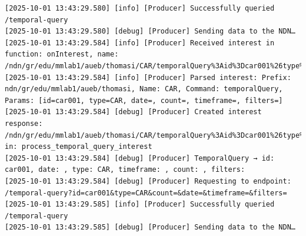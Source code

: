 \documentclass{article}
\begin{document}
\begin{lstlisting}[language=log, caption={Producer logs after receiving a \emph{GET by TYPE} request from \emph{MMLab2}}, label={lst:producer-logs-get-by-type-from-mmlab2}]
[2025-10-01 13:43:29.580] [info] [Producer] Successfully queried /temporal-query
[2025-10-01 13:43:29.580] [debug] [Producer] Sending data to the NDN…
[2025-10-01 13:43:29.584] [info] [Producer] Received interest in function: onInterest, name: /ndn/gr/edu/mmlab1/aueb/thomasi/CAR/temporalQuery%3Aid%3Dcar001%26type%3DCAR%26date%3D%26count%3D%26timeframe%3D%26filters%3D
[2025-10-01 13:43:29.584] [info] [Producer] Parsed interest: Prefix: ndn/gr/edu/mmlab1/aueb/thomasi, Name: CAR, Command: temporalQuery, Params: [id=car001, type=CAR, date=, count=, timeframe=, filters=]
[2025-10-01 13:43:29.584] [debug] [Producer] Created interest response: /ndn/gr/edu/mmlab1/aueb/thomasi/CAR/temporalQuery%3Aid%3Dcar001%26type%3DCAR%26date%3D%26count%3D%26timeframe%3D%26filters%3D in: process_temporal_query_interest
[2025-10-01 13:43:29.584] [debug] [Producer] TemporalQuery → id: car001, date: , type: CAR, timeframe: , count: , filters: 
[2025-10-01 13:43:29.584] [debug] [Producer] Requesting to endpoint: /temporal-query?id=car001&type=CAR&count=&date=&timeframe=&filters=
[2025-10-01 13:43:29.585] [info] [Producer] Successfully queried /temporal-query
[2025-10-01 13:43:29.585] [debug] [Producer] Sending data to the NDN… 
\end{lstlisting}
\end{document}
